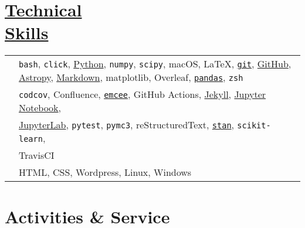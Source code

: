 \documentclass[margin]{res}
\begin{document}
\begin{resume}
\begin{tabular}{l p{4.3in}}
\end{tabular}







\section{\href{https://github.com/benjaminrose}{Technical \\Skills}}

\hspace{1pt}
\begin{tabular}{l p{4.5in}}

\hspace{-1em}{\bf Daily Use:} & 
\texttt{bash},
\texttt{click},
\href{https://www.python.org}{Python},
\texttt{numpy},
\texttt{scipy},
macOS,
\LaTeX,
\href{https://git-scm.com}{\texttt{git}},
\href{https://github.com/benjaminrose}{GitHub},
\href{http://www.astropy.org}{Astropy},
\href{http://daringfireball.net/projects/markdown/}{Markdown},
matplotlib,
Overleaf,
\href{http://pandas.pydata.org}{\texttt{pandas}},
\texttt{zsh}
\\

\hspace{-1em}{\bf Proficient:} & 
\texttt{codcov},
Confluence,
\href{http://dan.iel.fm/emcee/current/}{\texttt{emcee}},
GitHub Actions,
\href{https://jekyllrb.com}{Jekyll},
\href{http://jupyter.org}{Jupyter Notebook},
\\&
\href{https://jupyterlab.readthedocs.io/en/stable/}{JupyterLab},
\texttt{pytest},
\texttt{pymc3},
reStructuredText,
\href{http://mc-stan.org}{\texttt{stan}},
\texttt{scikit-learn},
\\&
TravisCI\vspace{0.3em}
\\

\hspace{-1em}{\bf Competent:} & HTML,
CSS,
Wordpress,
Linux,
Windows %
\end{tabular}




\section{Activities \& Service} %


\end{resume}
\end{document}
